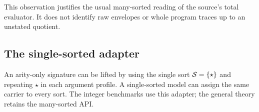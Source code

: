 This observation justifies the usual many-sorted reading of the source's
total evaluator. It does not identify raw envelopes or whole program traces
up to an unstated quotient.

\subsection{The single-sorted adapter}
An arity-only signature can be lifted by using the single sort
$\mathcal{S}=\{\star\}$ and repeating $\star$ in each argument profile. A
single-sorted model can assign the same carrier to every sort. The integer
benchmarks use this adapter; the general theory retains the many-sorted API.
